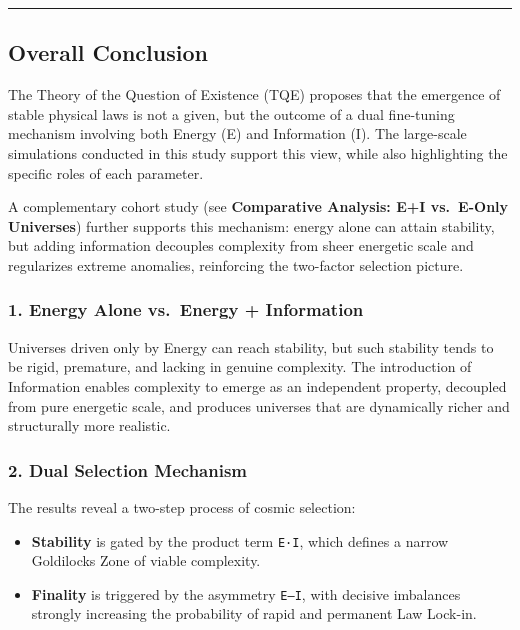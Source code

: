 \begin{center}\rule{0.5\linewidth}{0.5pt}\end{center}

\subsection{Overall Conclusion}\label{overall-conclusion}

The Theory of the Question of Existence (TQE) proposes that the
emergence of stable physical laws is not a given, but the outcome of a
dual fine-tuning mechanism involving both Energy (E) and Information
(I). The large-scale simulations conducted in this study support this
view, while also highlighting the specific roles of each parameter.

A complementary cohort study (see \textbf{Comparative Analysis: E+I
vs.~E-Only Universes}) further supports this mechanism: energy alone can
attain stability, but adding information decouples complexity from sheer
energetic scale and regularizes extreme anomalies, reinforcing the
two-factor selection picture.

\subsubsection{1. Energy Alone vs.~Energy +
Information}\label{energy-alone-vs.-energy-information}

Universes driven only by Energy can reach stability, but such stability
tends to be rigid, premature, and lacking in genuine complexity. The
introduction of Information enables complexity to emerge as an
independent property, decoupled from pure energetic scale, and produces
universes that are dynamically richer and structurally more realistic.

\subsubsection{2. Dual Selection
Mechanism}\label{dual-selection-mechanism}

The results reveal a two-step process of cosmic selection:

\begin{itemize}
\tightlist
\item
  \textbf{Stability} is gated by the product term \texttt{E·I}, which
  defines a narrow Goldilocks Zone of viable complexity.
\item
  \textbf{Finality} is triggered by the asymmetry
  \texttt{\textbar{}E–I\textbar{}}, with decisive imbalances strongly
  increasing the probability of rapid and permanent Law Lock-in.
\end{itemize}

